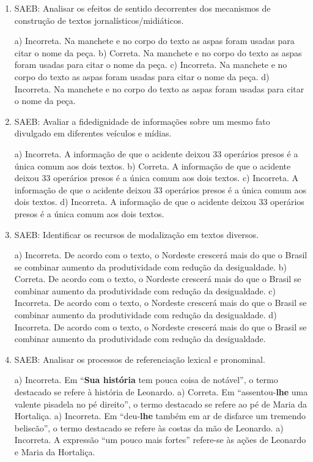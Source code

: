 \begin{enumerate}
	\item
SAEB: Analisar os efeitos de sentido decorrentes dos mecanismos de construção
de textos jornalísticos/midiáticos.

a) Incorreta. Na manchete e no corpo do texto as aspas foram usadas para citar o nome da peça.
b) Correta. Na manchete e no corpo do texto as aspas foram usadas para citar o nome da peça.
c) Incorreta. Na manchete e no corpo do texto as aspas foram usadas para citar o nome da peça.
d) Incorreta. Na manchete e no corpo do texto as aspas foram usadas para citar o nome da peça.

	\item
SAEB: Avaliar a fidedignidade de informações sobre um mesmo fato divulgado em
diferentes veículos e mídias.

a) Incorreta. A informação de que o acidente deixou 33 operários presos é a única comum aos dois textos.
b) Correta. A informação de que o acidente deixou 33 operários presos é a única comum aos dois textos.
c) Incorreta. A informação de que o acidente deixou 33 operários presos é a única comum aos dois textos.
d) Incorreta. A informação de que o acidente deixou 33 operários presos é a única comum aos dois textos.

	\item
SAEB: Identificar os recursos de modalização em textos diversos.

a) Incorreta. De acordo com o texto, o Nordeste crescerá mais do que o Brasil se combinar aumento
da produtividade com redução da desigualdade. 
b) Correta. De acordo com o texto, o Nordeste crescerá mais do que o Brasil se combinar aumento
da produtividade com redução da desigualdade. 
c) Incorreta. De acordo com o texto, o Nordeste crescerá mais do que o Brasil se combinar aumento
da produtividade com redução da desigualdade. 
d) Incorreta. De acordo com o texto, o Nordeste crescerá mais do que o Brasil se combinar aumento
da produtividade com redução da desigualdade.

	\item
SAEB: Analisar os processos de referenciação lexical e pronominal.

a) Incorreta.   Em ``\textbf{Sua história} tem pouca coisa de notável'', o termo destacado 
se refere à história de Leonardo.
a) Correta.   Em ``assentou-\textbf{lhe} uma valente pisadela no pé direito'', o termo destacado 
se refere ao pé de Maria da Hortaliça.
a) Incorreta.   Em ``deu-\textbf{lhe} também em ar de disfarce um tremendo beliscão'', o termo  
destacado se refere às costas da mão de Leonardo.
a) Incorreta.   A expressão ``um pouco mais fortes'' refere-se às ações de Leonardo e  
Maria da Hortaliça.	


\end{enumerate}
